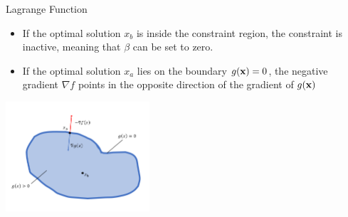 \documentclass[11pt,compress,t,notes=noshow, xcolor=table]{beamer}
\begin{document}
\begin{vbframe}{Lagrange Function}
\begin{itemize}
	\item If the optimal solution $x_b$ is inside the constraint region, the constraint is inactive, meaning that $\beta$ can be set to zero. 
	\item If the optimal solution $x_a$ lies on the boundary $g(\mathbf{x}) = 0$, the negative gradient $\nabla f$ points in the opposite direction of the gradient of $g(\mathbf{x})$
\end{itemize}

\begin{center}
	\includegraphics[width = 0.4\textwidth]{figure_man/constraint_lagrange.png}
\end{center}
\end{vbframe}













\end{document}
